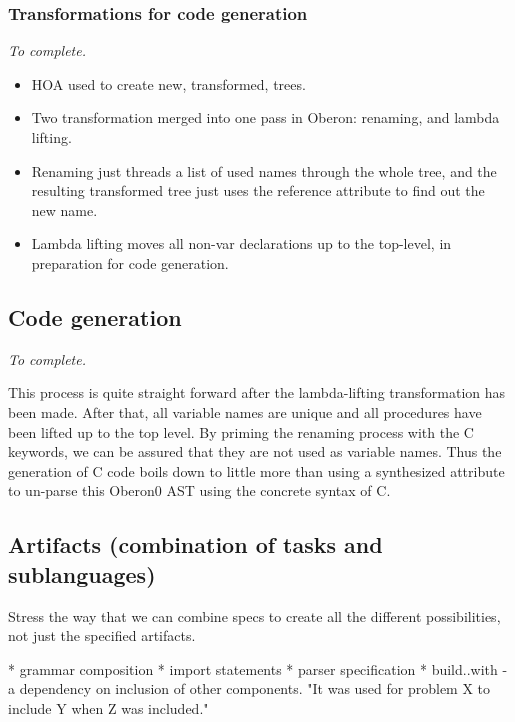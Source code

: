 \subsubsection{Transformations for code generation}

\emph{To complete.}
\begin{itemize}

\item HOA used to create new, transformed, trees.

\item Two transformation merged into one pass in Oberon: renaming, and lambda lifting.

\item Renaming just threads a list of used names through the whole tree, and the
      resulting transformed tree just uses the reference attribute to find out the
      new name.

\item Lambda lifting moves all non-var declarations up to the
      top-level, in preparation for code generation.

\end{itemize}

\subsection{Code generation}

\emph{To complete.}

This process is quite straight forward after the lambda-lifting
transformation has been made.  After that, all variable names are
unique and all procedures have been lifted up to the top level.  By
priming the renaming process with the C keywords, we can be assured
that they are not used as variable names.  Thus the generation of C
code boils down to little more than using a synthesized 
attribute to un-parse this Oberon0 AST using the concrete syntax of C.

\subsection{Artifacts (combination of tasks and sublanguages)}
\label{silver:sec:artifacts}

Stress the way that we can combine specs to create all the different
possibilities, not just the specified artifacts.

* grammar composition
* import statements
* parser specification
* build..with - a dependency on inclusion of other components.
  "It was used for problem X to include Y when Z was included."

